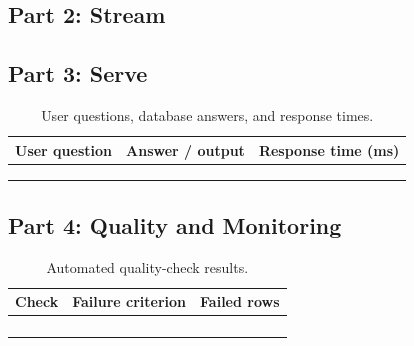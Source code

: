 \documentclass[11pt,letterpaper]{article}
\newcommand{\evidenceroot}{evidence/run-59ewk1}
\newcommand{\evidenceroot}{documentation/evidence/run-59ewk1}
\begin{document}
\noindent\begin{minipage}{\linewidth}

\end{minipage}


\subsection{Part 2: Stream}

\subsection{Part 3: Serve}

\begin{table}[htbp]
    \centering
    \caption{User questions, database answers, and response times.}
    \begin{tabularx}{\linewidth}{@{}XXX@{}}
        \toprule
        User question & Answer / output & Response time (ms) \\
        \midrule
        & & \\
        & & \\
        & & \\
        \bottomrule
    \end{tabularx}
\end{table}

\subsection{Part 4: Quality and Monitoring}

\begin{table}[htbp]
    \centering
    \caption{Automated quality-check results.}
    \begin{tabularx}{\linewidth}{@{}XXr@{}}
        \toprule
        Check & Failure criterion & Failed rows \\
        \midrule
        & & \\
        & & \\
        & & \\
        & & \\
        \bottomrule
    \end{tabularx}
\end{table}
\end{document}
